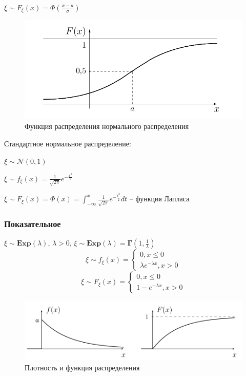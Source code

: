 $\xi \sim F_{\xi}(x) = \Phi \left( \frac{x-a}{\sigma} \right)$
\begin{figure}[H]
      \centering
      \includegraphics[width=0.8\linewidth]{img/frnorm.png}
      \caption{Функция распределения нормального распределения}
\end{figure}

Стандартное нормальное распределение:

$\xi \sim \mathcal{N}(0,1)$

$\xi \sim f_{\xi}(x) = \frac{1}{\sqrt{2\pi}} e^{-\frac{x^{2}}{2}}$

$\xi \sim F_{\xi}(x) = \Phi(x) = \int_{-\infty}^{x} \frac{1}{\sqrt{2\pi}} e^{-\frac{t^{2}}{2}} dt$ -- функция Лапласа

\subsubsection{Показательное}
$\xi \sim \boldsymbol{Exp}(\lambda)$, $\lambda > 0$, $\xi \sim \boldsymbol{Exp}(\lambda) = \boldsymbol{\Gamma}(1, \frac{1}{\lambda})$
\begin{equation*}
	\xi \sim f_{\xi}(x) = 
		\begin{cases}
			0 , x \leq 0 \\			
			\lambda e^{-\lambda x}, x > 0
		\end{cases}
\end{equation*}
\begin{equation*}
	\xi \sim F_{\xi}(x) = 
		\begin{cases}
			0 , x \leq 0 \\			
			1-e^{-\lambda x}, x > 0
		\end{cases}
\end{equation*}
\begin{figure}[H]
      \centering
      \includegraphics[width=0.8\linewidth]{img/expon.png}
      \caption{Плотность и функция распределения}
\end{figure}

